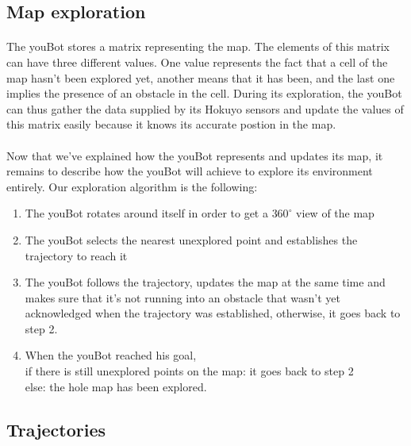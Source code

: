\documentclass[12pt,a4paper]{article}
\begin{document}
\subsection{Map exploration}
\paragraph{}
The youBot stores a matrix representing the map. The elements of this matrix can have three different values. One value represents the fact that a cell of the map hasn't been explored yet, another means that it has been, and the last one implies the presence of an obstacle in the cell. During its exploration, the youBot can thus gather the data supplied by its Hokuyo sensors and update the values of this matrix easily because it knows its accurate postion in the map.   

\paragraph{} 
Now that we've explained how the youBot represents and updates its map, it remains to describe how the youBot will achieve to explore its environment entirely. Our exploration algorithm is the following:

\begin{enumerate}
\item The youBot rotates around itself in order to get a $360^{\circ}$ view of the map

\item The youBot selects the nearest unexplored point and establishes the trajectory to reach it

\item The youBot follows the trajectory, updates the map at the same time and makes sure that it's not running into an obstacle that wasn't yet acknowledged when the trajectory was established, otherwise, it goes back to step 2.

\item When the youBot reached his goal, \\if there is still unexplored points on the map: it goes back to step 2 \\else: the hole map has been explored.

\end{enumerate}



\subsection{Trajectories}
\end{document}
